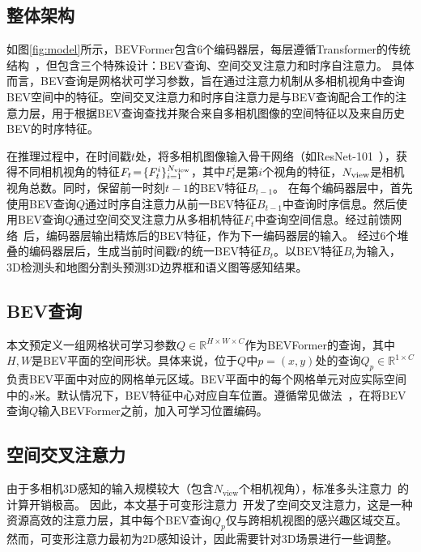 \documentclass{article}
\begin{document}
\subsection{整体架构}
如图\ref{fig:model}所示，BEVFormer包含6个编码器层，每层遵循Transformer的传统结构~\cite{vaswani2017attention}，但包含三个特殊设计：BEV查询、空间交叉注意力和时序自注意力。
具体而言，BEV查询是网格状可学习参数，旨在通过注意力机制从多相机视角中查询BEV空间中的特征。空间交叉注意力和时序自注意力是与BEV查询配合工作的注意力层，用于根据BEV查询查找并聚合来自多相机图像的空间特征以及来自历史BEV的时序特征。



在推理过程中，在时间戳$t$处，将多相机图像输入骨干网络（如ResNet-101~\cite{he2016deep}），获得不同相机视角的特征$F_t\!=\!\{F_t^i\}_{i=1}^{N_{\rm view}}$，其中$F_t^i$是第$i$个视角的特征，$N_{\rm view}$是相机视角总数。同时，保留前一时刻$t-1$的BEV特征$B_{t\!-\!1}$。
%
%
在每个编码器层中，首先使用BEV查询$Q$通过时序自注意力从前一BEV特征$B_{t\!-\!1}$中查询时序信息。然后使用BEV查询$Q$通过空间交叉注意力从多相机特征$F_t$中查询空间信息。经过前馈网络~\cite{vaswani2017attention}后，编码器层输出精炼后的BEV特征，作为下一编码器层的输入。
经过6个堆叠的编码器层后，生成当前时间戳$t$的统一BEV特征$B_t$。以BEV特征$B_t$为输入，3D检测头和地图分割头预测3D边界框和语义图等感知结果。




\subsection{BEV查询}\label{bev_queries}
本文预定义一组网格状可学习参数$Q\!\in\! \mathbb{R}^{H\!\times\!W\!\times\!C}$作为BEVFormer的查询，其中$H,W$是BEV平面的空间形状。具体来说，位于$Q$中$p=(x,y)$处的查询$Q_p\!\in\!\mathbb{R}^{1\!\times\!C}$负责BEV平面中对应的网格单元区域。BEV平面中的每个网格单元对应实际空间中的$s$米。默认情况下，BEV特征中心对应自车位置。遵循常见做法~\cite{gehring2017convolutional}，在将BEV查询$Q$输入BEVFormer之前，加入可学习位置编码。 


\subsection{空间交叉注意力}\label{spatial_attention}
由于多相机3D感知的输入规模较大（包含$N_\text{view}$个相机视角），标准多头注意力~\cite{vaswani2017attention}的计算开销极高。
因此，本文基于可变形注意力~\cite{zhu2020deformable}开发了空间交叉注意力，这是一种资源高效的注意力层，其中每个BEV查询$Q_p$仅与跨相机视图的感兴趣区域交互。
%
然而，可变形注意力最初为2D感知设计，因此需要针对3D场景进行一些调整。
\end{document}
